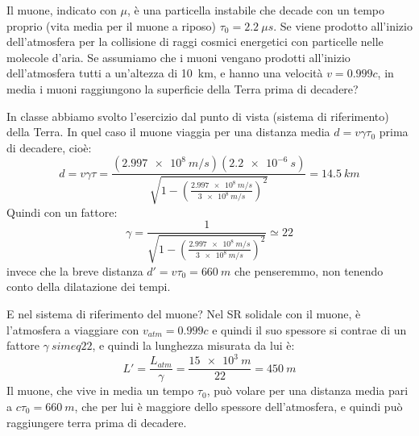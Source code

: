 \begin{Exercise}[title={Il decadimento del muone, visto dal muone}]
  Il muone, indicato con $\mu$, \`e una particella instabile che
  decade con un tempo proprio (vita media per il muone a riposo)
  $\tau_0=\SI{2.2}{\mu s}$. Se viene prodotto all'inizio
  dell'atmosfera per la collisione di raggi cosmici energetici con
  particelle nelle molecole d'aria. Se assumiamo che i muoni vengano
  prodotti all'inizio dell'atmosfera tutti a un'altezza di
  \SI{10}{km}, e hanno una velocit\`a $v=0.999c$, in media i muoni
  raggiungono la superficie della Terra prima di decadere?
\end{Exercise}
\begin{Answer}
  In classe abbiamo svolto l'esercizio dal punto di vista (sistema di riferimento) della Terra.
  In quel caso il muone viaggia per una distanza media $d = v\gamma\tau_0$ prima di decadere, cio\`e:
  \begin{equation*}
    d = v\gamma\tau = \frac{(\SI{2.997e8}{m/s})(\SI{2.2e-6}{s})}{\sqrt{1-\left(\frac{\SI{2.997e8}{m/s}}{\SI{3e8}{m/s}}\right)^2}} = \SI{14.5}{km}
  \end{equation*}
  Quindi con un fattore:
  \begin{equation*}
    \gamma = \frac{1}{\sqrt{1-\left(\frac{\SI{2.997e8}{m/s}}{\SI{3e8}{m/s}}\right)^2}} \simeq 22
  \end{equation*}
  invece che la breve distanza $d'=v\tau_0=\SI{660}{m}$ che penseremmo, non tenendo conto della dilatazione dei tempi.

  E nel sistema di riferimento del muone? Nel SR solidale con il muone, \`e l'atmosfera a viaggiare con $v_{atm}=0.999c$ e quindi il suo spessore si
  contrae di un fattore $\gamma \ simeq 22$, e quindi la lunghezza misurata da lui \`e:  
  \begin{equation*}
    L' = \frac{L_{atm}}{\gamma} = \frac{\SI{15e3}{m}}{22}  = \SI{450}{m}
  \end{equation*}
  Il muone, che vive in media un tempo $\tau_0$, pu\`o volare per una
  distanza media pari a $c\tau_0=\SI{660}{m}$, che per lui \`e
  maggiore dello spessore dell'atmosfera, e quindi pu\`o raggiungere
  terra prima di decadere.
\end{Answer}

